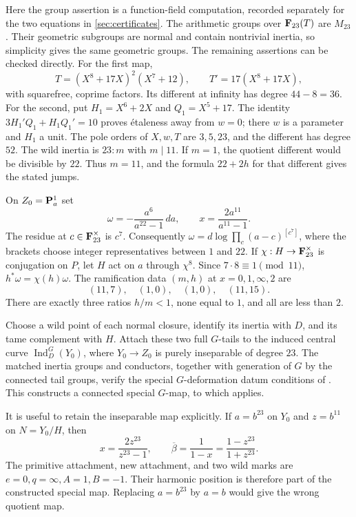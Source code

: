 Here the group assertion is a function-field computation, recorded
separately for the two equations in \cref{sec:certificates}.
The arithmetic groups over $\mathbf F_{23}(T)$ are $M_{23}$.  Their geometric
subgroups are normal and contain nontrivial inertia, so simplicity
gives the same geometric groups.  The remaining assertions can be
checked directly.  For the first map,
\[
 T=(X^8+17X)^2(X^7+12),\qquad T'=17(X^8+17X),
\]
with squarefree, coprime factors.  Its different at infinity has
degree $44-8=36$.  For the second, put $H_1=X^6+2X$ and $Q_1=X^5+17$.
The identity $3H_1'Q_1+H_1Q_1'=10$ proves \'etaleness away from
$w=0$; there $w$ is a parameter and $H_1$ a unit.
The pole orders of $X,w,T$ are $3,5,23$, and the different has degree
$52$.  The wild inertia is $23{:}m$ with $m\mid11$.
If $m=1$, the quotient different would be divisible by $22$.
Thus $m=11$, and the formula $22+2h$ for that different gives the
stated jumps.

On $Z_0=\mathbf P^1_a$ set
\begin{equation}
 \omega=-\frac{a^6}{a^{22}-1}\,da,
 \qquad x=\frac{2a^{11}}{a^{11}-1}.
\label{eq:harmonic-deformation-datum}
\end{equation}
The residue at $c\in\mathbf F_{23}^{\times}$ is $c^7$.  Consequently
$\omega=d\log\prod_c(a-c)^{[c^7]}$, where the brackets choose
integer representatives between $1$ and $22$.
If $\chi:H\to\mathbf F_{23}^{\times}$ is conjugation on $P$, let $H$ act
on $a$ through $\chi^8$.  Since $7\cdot8\equiv1\pmod{11}$,
$h^*\omega=\chi(h)\omega$.
The ramification data $(m,h)$ at $x=0,1,\infty,2$ are
\[
 (11,7),\quad(1,0),\quad(1,0),\quad(11,15).
\]
There are exactly three ratios $h/m<1$, none equal to $1$, and all
are less than $2$.

Choose a wild point of each normal closure, identify its inertia with
$D$, and its tame complement with $H$.  Attach these two full $G$-tails
to the induced central curve $\operatorname{Ind}_D^G(Y_0)$, where
$Y_0\to Z_0$ is purely inseparable of degree $23$.
The matched inertia groups and conductors, together with generation
of $G$ by the connected tail groups, verify the special
$G$-deformation datum conditions of \cite[Definition~2.13]{Wewers}.
This constructs a connected special $G$-map, to which
\cite[Theorem~4.5]{Wewers} applies.

It is useful to retain the inseparable map explicitly.  If $a=b^{23}$
on $Y_0$ and $z=b^{11}$ on $N=Y_0/H$, then
\begin{equation}
 x=\frac{2z^{23}}{z^{23}-1},\qquad
 \overline\beta=\frac{1}{1-x}
              =\frac{1-z^{23}}{1+z^{23}}.
\label{eq:harmonic-central-map}
\end{equation}
The primitive attachment, new attachment, and two wild marks are
$e=0,q=\infty,A=1,B=-1$.  Their harmonic position is therefore part
of the constructed special map.  Replacing $a=b^{23}$ by $a=b$ would
give the wrong quotient map.

